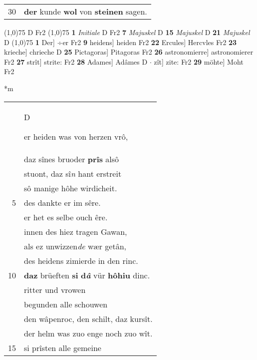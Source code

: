 \documentclass[8pt,a4paper,notitlepage]{article}
\begin{document}
\begin{table}[ht]
\begin{minipage}[t]{0.5\linewidth}
\begin{tabular}{rl}
30 & \textbf{der} kunde \textbf{wol} von \textbf{steinen} sagen.\\ 
\end{tabular}
\scriptsize
\line(1,0){75} \newline
D Fr2 \newline
\line(1,0){75} \newline
\textbf{1} \textit{Initiale} D Fr2  \textbf{7} \textit{Majuskel} D  \textbf{15} \textit{Majuskel} D  \textbf{21} \textit{Majuskel} D  \newline
\line(1,0){75} \newline
\textbf{1} Der] ÷er Fr2 \textbf{9} heidens] heiden Fr2 \textbf{22} Ercules] Hercvles Fr2 \textbf{23} krieche] chrieche D \textbf{25} Pictagoras] Pitagoras Fr2 \textbf{26} astronomierre] astronomierer Fr2 \textbf{27} strît] strite: Fr2 \textbf{28} Adames] Adâmes D  $\cdot$ zît] zite: Fr2 \textbf{29} möhte] Moht Fr2 \newline
\end{minipage}
\hspace{0.5cm}
\begin{minipage}[t]{0.5\linewidth}
\small
\begin{center}*m
\end{center}
\begin{tabular}{rl}
 & \begin{large}D\end{large}er heiden was von herzen vrô,\\ 
 & daz sînes bruoder \textbf{prîs} alsô\\ 
 & stuont, daz sî\textit{n} hant erstreit\\ 
 & sô manige hôhe wirdicheit.\\ 
5 & des dankte er im sêre.\\ 
 & er het es selbe ouch êre.\\ 
 & innen des hiez tragen Gawan,\\ 
 & als ez unwizzen\textit{de} wær getân,\\ 
 & des heidens zimierde in den rinc.\\ 
10 & \textbf{daz} brüeften \textbf{si} \textbf{d\textit{â}} vür \textbf{hôhiu} dinc.\\ 
 & ritter und vrowen\\ 
 & begunden alle schouwen\\ 
 & den wâpenroc, den schilt, daz kursît.\\ 
 & der helm was zuo enge noch zuo wît.\\ 
15 & si prîsten alle gemeine\\ 

\end{tabular}
\end{minipage}
\end{table}
\end{document}
